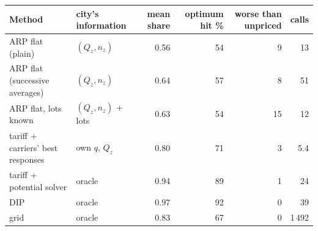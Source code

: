 \begin{tabular}{llrrrr}
\toprule
Method & city's information & mean share & optimum hit \% & worse than unpriced & calls \\
\midrule
ARP flat (plain) & $(Q_z,n_z)$ & 0.56 & 54 & 9 & 13 \\
ARP flat (successive averages) & $(Q_z,n_z)$ & 0.64 & 57 & 8 & 51 \\
ARP flat, lots known & $(Q_z,n_z)$ + lots & 0.63 & 54 & 15 & 12 \\
tariff + carriers' best responses & own $q$, $Q_z$ & 0.80 & 71 & 3 & 5.4 \\
tariff + potential solver & oracle & 0.94 & 89 & 1 & 24 \\
DIP & oracle & 0.97 & 92 & 0 & 39 \\
grid & oracle & 0.83 & 67 & 0 & 1\,492 \\
\bottomrule
\end{tabular}
